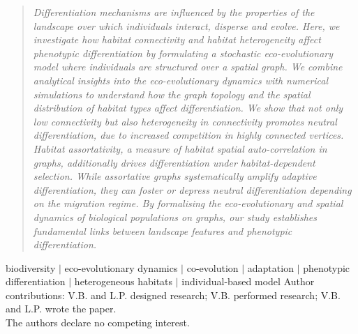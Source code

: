 \begin{quote} %
  \small{\textit{
	Differentiation mechanisms are influenced by the properties of the landscape over which individuals interact, disperse and evolve. 
	Here, we investigate how habitat connectivity and habitat heterogeneity affect phenotypic differentiation by formulating a stochastic eco-evolutionary model where individuals are structured over a spatial graph.
	We combine analytical insights into the eco-evolutionary dynamics with numerical simulations to understand how the graph topology and the spatial distribution of habitat types affect differentiation. 
	We show that not only low connectivity but also heterogeneity in connectivity promotes neutral differentiation, due to increased competition in highly connected vertices. 
	Habitat assortativity, a measure of habitat spatial auto-correlation in graphs, additionally drives differentiation under habitat-dependent selection.
	While assortative graphs systematically amplify adaptive differentiation, they can foster or depress neutral differentiation depending on the migration regime.
	By formalising the eco-evolutionary and spatial dynamics of biological populations on graphs, our study establishes fundamental links between landscape features and phenotypic differentiation.
  }}
  \end{quote}
  biodiversity $|$ eco-evolutionary dynamics $|$ co-evolution $|$ adaptation $|$ phenotypic differentiation $|$ heterogeneous habitats $|$ individual-based model
  \vskip12pt%
  \noindent \small{Author contributions: V.B. and L.P. designed research; V.B. performed research; V.B. and L.P. wrote the paper.\\
  The authors declare no competing interest.
  }
  
  \vspace{2cm}
  
  
  
